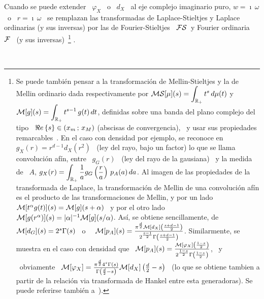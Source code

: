 Cuando se puede extender \ $\varphi_X$ \  o \ $d_X$ \ al eje complejo imaginario
puro, $w  = \imath \, \omega$ \  o \ $r =  \imath \, \omega$ \  se remplazan las
transformadas de Laplace-Stieltjes y Laplace ordinarias (y sus inversas) por las
de  Fourier-Stieltjes   \  $\mathcal{FS}$\   y  Fourier  ordinaria   \  $\mathcal{F}$  \   (y  sus
inversas)~\footnote{Se   puede  tambi\'en  pensar   a  la   transformaci\'on  de
  Mellin-Stieltjes   y  la   de  Mellin   ordinario  dada   respectivamente  por
  $\displaystyle  \mathcal{MS}[\mu](s) =  \int_{\mathbb{R}_+} t^s  \, d\mu(t)$  \quad  y \quad
  $\displaystyle  \mathcal{M}[g](s) = \int_{\mathbb{R}_+}  t^{s-1} \,  g(t) \,  dt$, definidas
  sobre una  banda del  plano complejo del  tipo \  $\Re e \left\{ s \right\} \in (x_m  \, ; \, x_M)$
  (abscisas de convergencia), \  y usar sus propiedades remarcables~\cite{Zol57,
    Pou99, Pou10,  Wid46, ParKam01}.   En el caso  con densidad por  ejemplo, se
  reconoce en \  $g_X(r) = r^{d-1} d_X\left( r^2 \right)$ \  (ley del rayo, bajo
  un factor) lo  que se llama convoluci\'on af\'in, entre \  $g_G(r)$ \ (ley del
  rayo  de  la gausiana)  \  y  la medida  de  \  $A$,  $\displaystyle g_X(r)  =
  \int_{\mathbb{R}_+} \frac{1}{a} g_G\left( \frac{r}{a} \right) \, p_A(a) \, da$.  Al
  imagen de las  propiedades de la transformada de  Laplace, la transformaci\'on
  de Mellin de  una convoluci\'on af\'in es el  producto de las transformaciones
  de Mellin, y por un lado \ $\mathcal{M}[t^\alpha g(t)](s) = \mathcal{M}[g](s+\alpha)$ \ y por el
  otro lado  \ $\mathcal{M}[g(r^\alpha)](s) = |\alpha|^{-1}  \mathcal{M}[g](s/\alpha)$.  As\'i, se
  obtiene  sencillamente,  de  \  $\mathcal{M}[d_G](s)  =  2^s  \Gamma(s)$~\cite[Cap.~12,
  Tabla~12.1]{Pou10}   o~\cite[Cap.~18,  Tabla~18.1]{Pou99}   \   $\mathcal{M}[p_A](s)  =
  \frac{\pi^{\frac{d}{2}}              \mathcal{M}[d_X]\left(             \frac{s+d-1}{2}
    \right)}{2^{\frac{s-1}{2}} \Gamma\left( \frac{s+d-1}{2} \right)}$.
  Similarmente,  se  muestra  en  el  caso  con densidad  que  \  $\mathcal{M}[p_A](s)  =
  \frac{\mathcal{M}[\varphi_X]\left(       \frac{1-s}{2}       \right)}{2^{\frac{1-s}{2}}
    \Gamma\left( \frac{1-s}{2} \right)}$,
  \   y   \   obviamente   \  $\mathcal{M}[\varphi_X]   =   \frac{\pi^{\frac{d}{2}}   4^s
    \Gamma(s)}{\Gamma\left( \frac{d}{2} - s \right)} \mathcal{M}[d_X]\left( \frac{d}{2} -
    s  \right)$ \  (lo que  se obtiene  tambien a  partir de  la  relaci\'on via
  transformada de  Hankel entre esta generadoras). Se  puede referirse tambi\'en
  a~\cite[\S~3.2.1]{Zoz12}).  }
%
\cite{Zol57, Pou99, Pou10, Wid46, ParKam01}.

\

